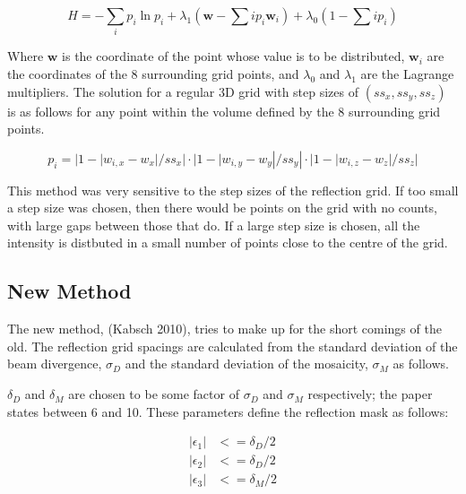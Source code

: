 \documentclass[a4paper,10pt]{article}
\begin{document}
\begin{equation}
  H = - \sum\limits_{i} p_i \ln{p_i} 
      + \lambda_1 \left(\bm{w} - \sum\limits{i} p_i \bm{w}_i \right)
      + \lambda_0 \left(1 - \sum\limits{i} p_i \right)
\end{equation}

Where $\bm{w}$ is the coordinate of the point whose value is to be distributed, 
$\bm{w}_i$ are the coordinates of the 8 surrounding grid points, and $\lambda_0$
and $\lambda_1$ are the Lagrange multipliers. The solution for a regular 3D grid
with step sizes of $(ss_x, ss_y, ss_z)$ is as follows for any point within the
volume defined by the 8 surrounding grid points.

\begin{equation}
  p_i = |1 - |w_{i,x} - w_x| / ss_x| \cdot 
        |1 - |w_{i,y} - w_y| / ss_y| \cdot
        |1 - |w_{i,z} - w_z| / ss_z|
\end{equation}

This method was very sensitive to the step sizes of the reflection grid. If too
small a step size was chosen, then there would be points on the grid with no
counts, with large gaps between those that do. If a large step size is chosen,
all the intensity is distbuted in a small number of points close to the centre
of the grid.

\subsection{New Method}

The new method, (Kabsch 2010), tries to make up for the short comings of the
old. The reflection grid spacings are calculated from the standard deviation
of the beam divergence, $\sigma_D$ and the standard deviation of the mosaicity,
$\sigma_M$ as follows.

$\delta_D$ and $\delta_M$ are chosen to be some factor of $\sigma_D$ and 
$\sigma_M$ respectively; the paper states between 6 and 10. These parameters 
define the reflection mask as follows:

\begin{equation}
  \begin{aligned}
    |\epsilon_1| &<= \delta_D / 2 \\
    |\epsilon_2| &<= \delta_D / 2 \\
    |\epsilon_3| &<= \delta_M / 2
  \end{aligned}
  \label{equation: reflection mask}
\end{equation}
\end{document}
